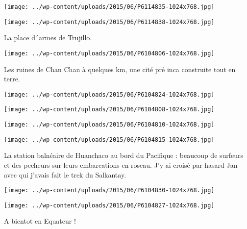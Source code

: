 \begin{center} \texttt{[image: ../wp-content/uploads/2015/06/P6114835-1024x768.jpg]} \end{center}

 

 

\begin{center} \texttt{[image: ../wp-content/uploads/2015/06/P6114838-1024x768.jpg]} \end{center}

 

 La place d´armes de Trujillo. 

 

\begin{center} \texttt{[image: ../wp-content/uploads/2015/06/P6104806-1024x768.jpg]} \end{center}

 

 Les ruines de Chan Chan à quelques km, une cité pré inca construite tout en terre. 

 

\begin{center} \texttt{[image: ../wp-content/uploads/2015/06/P6104824-1024x768.jpg]} \end{center}

 

 

\begin{center} \texttt{[image: ../wp-content/uploads/2015/06/P6104808-1024x768.jpg]} \end{center}

 

 

\begin{center} \texttt{[image: ../wp-content/uploads/2015/06/P6104810-1024x768.jpg]} \end{center}

 

 

\begin{center} \texttt{[image: ../wp-content/uploads/2015/06/P6104815-1024x768.jpg]} \end{center}

 

 La station balnéaire de Huanchaco au bord du Pacifique : beaucoup de surfeurs et des pecheurs sur leurs embarcations en roseau. J'y ai croisé par hasard Jan avec qui j'avais fait le trek du Salkantay. 

 

\begin{center} \texttt{[image: ../wp-content/uploads/2015/06/P6104830-1024x768.jpg]} \end{center}

 

 

\begin{center} \texttt{[image: ../wp-content/uploads/2015/06/P6104827-1024x768.jpg]} \end{center}

 

 A bientot en Equateur !


 
 
